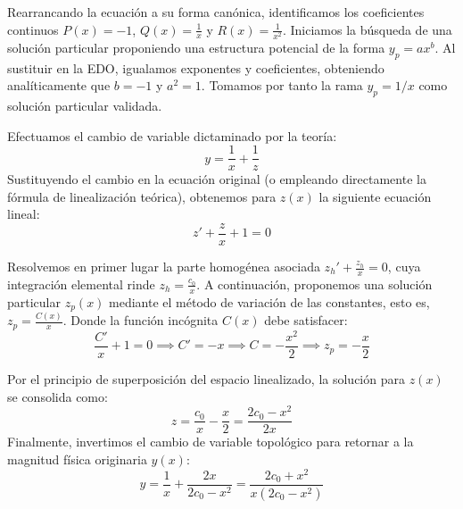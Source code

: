 \documentclass[11pt,a4paper]{article}
\theoremstyle{definition}
\theoremstyle{plain}
\begin{document}
\begin{tcolorbox}
Rearrancando la ecuación a su forma canónica, identificamos los coeficientes continuos $P(x) = -1$, $Q(x) = \frac{1}{x}$ y $R(x) = \frac{1}{x^2}$.
Iniciamos la búsqueda de una solución particular proponiendo una estructura potencial de la forma $y_p = a x^b$. Al sustituir en la EDO, igualamos exponentes y coeficientes, obteniendo analíticamente que $b = -1$ y $a^2 = 1$. Tomamos por tanto la rama $y_p = 1/x$ como solución particular validada.

Efectuamos el cambio de variable dictaminado por la teoría:
$$ y = \frac{1}{x} + \frac{1}{z} $$
Sustituyendo el cambio en la ecuación original (o empleando directamente la fórmula de linealización teórica), obtenemos para $z(x)$ la siguiente ecuación lineal:
$$ z' + \frac{z}{x} + 1 = 0 $$

Resolvemos en primer lugar la parte homogénea asociada $z_h' + \frac{z_h}{x} = 0$, cuya integración elemental rinde $z_h = \frac{c_0}{x}$.
A continuación, proponemos una solución particular $z_p(x)$ mediante el método de variación de las constantes, esto es, $z_p = \frac{C(x)}{x}$. Donde la función incógnita $C(x)$ debe satisfacer:
$$ \frac{C'}{x} + 1 = 0 \implies C' = -x \implies C = -\frac{x^2}{2} \implies z_p = -\frac{x}{2} $$

Por el principio de superposición del espacio linealizado, la solución para $z(x)$ se consolida como:
$$ z = \frac{c_0}{x} - \frac{x}{2} = \frac{2c_0 - x^2}{2x} $$
Finalmente, invertimos el cambio de variable topológico para retornar a la magnitud física originaria $y(x)$:
$$ y = \frac{1}{x} + \frac{2x}{2c_0 - x^2} = \frac{2c_0 + x^2}{x(2c_0 - x^2)} $$

\begin{figure}[H]
    \centering
\end{figure}
\end{tcolorbox}
\end{document}
